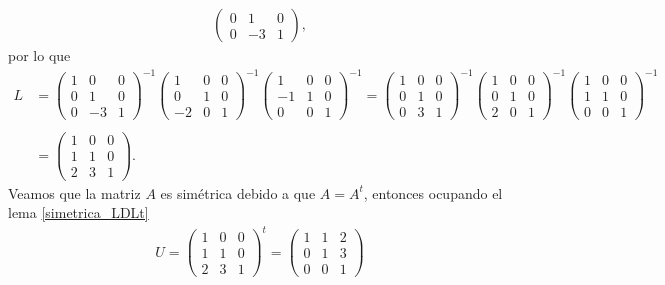 \documentclass[11pt,letterpaper]{article}
\begin{document}
\begin{enumerate}
\begin{align*}
\begin{pmatrix}
0 & 1 & 0\\
0 & -3 & 1
\end{pmatrix},
\end{align*}
por lo que
\begin{align*}
L&=\begin{pmatrix}
1 & 0 & 0 \\
0 & 1 & 0\\
0 & -3 & 1
\end{pmatrix}^{-1}\begin{pmatrix}
 1 & 0 & 0 \\
 0 & 1 & 0\\
-2 & 0 & 1
\end{pmatrix}^{-1}\begin{pmatrix}
 1 & 0 & 0 \\
-1 & 1 & 0\\
 0 & 0 & 1
\end{pmatrix}^{-1}=
\begin{pmatrix}
1 & 0 & 0 \\
0 & 1 & 0\\
0 & 3 & 1
\end{pmatrix}^{-1}\begin{pmatrix}
 1 & 0 & 0 \\
 0 & 1 & 0\\
 2 & 0 & 1
\end{pmatrix}^{-1}\begin{pmatrix}
 1 & 0 & 0 \\
 1 & 1 & 0\\
 0 & 0 & 1
\end{pmatrix}^{-1}\\ \\
&=\begin{pmatrix}
 1 & 0 & 0 \\
 1 & 1 & 0\\
 2 & 3 & 1
\end{pmatrix}.
\end{align*}
Veamos que la matriz $A$ es simétrica debido a que $A=A^t$, entonces ocupando el lema \ref{simetrica_LDLt} 
\begin{align*}
U = \begin{pmatrix}
 1 & 0 & 0 \\
 1 & 1 & 0\\
 2 & 3 & 1
\end{pmatrix}^{t} =
\begin{pmatrix}
 1 & 1 & 2 \\
 0 & 1 & 3\\
 0 & 0 & 1
\end{pmatrix} 

\end{align*}
\end{enumerate}
\end{document}
